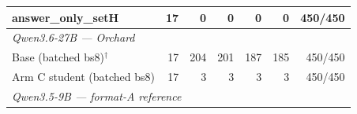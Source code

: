 \begin{table}[t]
{\begin{tabular}{lrrrrrr}
answer\_only\_setH & 17 & 0 & 0 & 0 & 0 & 450/450 \\
\midrule
\multicolumn{7}{l}{\textit{Qwen3.6-27B --- Orchard}} \\
Base (batched bs8)$^{\dagger}$ & 17 & 204 & 201 & 187 & 185 & 450/450 \\
Arm C student (batched bs8) & 17 & 3 & 3 & 3 & 3 & 450/450 \\
\midrule
\multicolumn{7}{l}{\textit{Qwen3.5-9B --- format-A reference}} \\

\end{tabular}}
\end{table}
